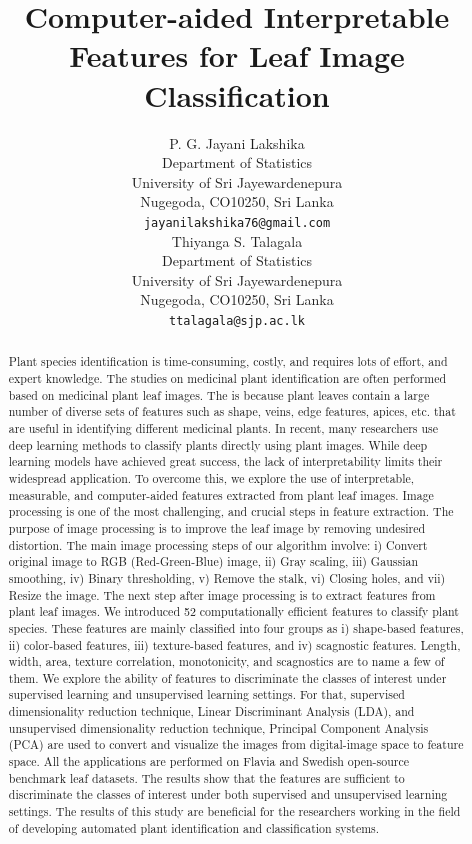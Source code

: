 \documentclass{article}
\title{Computer-aided Interpretable Features for Leaf Image Classification}
\author{ {\hspace{1mm}P. G. Jayani Lakshika} \\
	Department of Statistics\\
	University of Sri Jayewardenepura\\
	Nugegoda, CO10250, Sri Lanka \\
	\texttt{jayanilakshika76@gmail.com} \\
	\And
	{
	\hspace{1mm}Thiyanga S. Talagala} \\
	Department of Statistics\\
	University of Sri Jayewardenepura \\
	Nugegoda, CO10250, Sri Lanka\\
	\texttt{ttalagala@sjp.ac.lk} \\
}
\begin{document}
\maketitle

\begin{abstract}
	Plant species identification is time-consuming, costly, and requires lots of effort, and expert knowledge. The studies on medicinal plant identification are often performed based on medicinal plant leaf images. The is because plant leaves contain a large number of diverse sets of features such as shape, veins, edge features, apices, etc. that are useful in identifying different medicinal plants. In recent, many researchers use deep learning methods to classify plants directly using plant images. While deep learning models have achieved great success, the lack of interpretability limits their widespread application. To overcome this, we explore the use of interpretable, measurable, and computer-aided features extracted from plant leaf images.   Image processing is one of the most challenging, and crucial steps in feature extraction. The purpose of image processing is to improve the leaf image by removing undesired distortion. The main image processing steps of our algorithm involve: i) Convert original image to RGB (Red-Green-Blue) image, ii) Gray scaling, iii) Gaussian smoothing, iv) Binary thresholding, v) Remove the stalk, vi) Closing holes, and vii) Resize the image. The next step after image processing is to extract features from plant leaf images. We introduced 52 computationally efficient features to classify plant species. These features are mainly classified into four groups as i) shape-based features, ii) color-based features, iii) texture-based features, and iv) scagnostic features. Length, width, area, texture correlation, monotonicity, and scagnostics are to name a few of them. We explore the ability of features to discriminate the classes of interest under supervised learning and unsupervised learning settings.  For that, supervised dimensionality reduction technique, Linear Discriminant Analysis (LDA), and unsupervised dimensionality reduction technique, Principal Component Analysis (PCA) are used to convert and visualize the images from digital-image space to feature space. All the applications are performed on Flavia and Swedish open-source benchmark leaf datasets. The results show that the features are sufficient to discriminate the classes of interest under both supervised and unsupervised learning settings. The results of this study are beneficial for the researchers working in the field of developing automated plant identification and classification systems.
\end{abstract}
\end{document}
